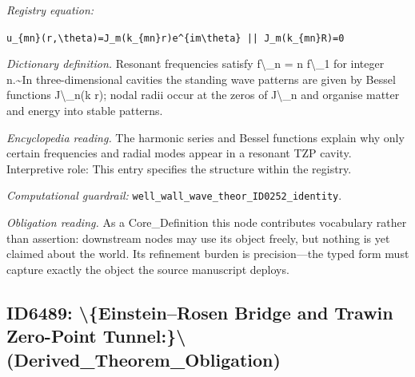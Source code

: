 \documentclass[11pt]{article}
\theoremstyle{remark}
\begin{document}
\noindent\textit{Registry equation:}\par
{\small\texttt{u\_\{mn\}(r,\textbackslash{}theta)=J\_m(k\_\{mn\}r)e\textasciicircum{}\{im\textbackslash{}theta\} || J\_m(k\_\{mn\}R)=0}}\par\medskip
\noindent\textit{Dictionary definition.} Resonant frequencies satisfy f\textbackslash{}\_n = n f\textbackslash{}\_1 for integer n.\textasciitilde{}In three-dimensional cavities the standing wave patterns are given by Bessel functions J\textbackslash{}\_n(k r); nodal radii occur at the zeros of J\textbackslash{}\_n and organise matter and energy into stable patterns.\par\medskip
\noindent\textit{Encyclopedia reading.} The harmonic series and Bessel functions explain why only certain frequencies and radial modes appear in a resonant TZP cavity. Interpretive role: This entry specifies the structure within the registry.
\par\medskip\noindent\textit{Computational guardrail:} \texttt{well\_wall\_wave\_theor\_ID0252\_identity}.
\par\medskip\noindent\textit{Obligation reading.} As a Core\_Definition this node contributes vocabulary rather than assertion: downstream nodes may use its object freely, but nothing is yet claimed about the world. Its refinement burden is precision---the typed form must capture exactly the object the source manuscript deploys.

\subsection{ID6489: \textbackslash{}\{Einstein--Rosen Bridge and Trawin Zero-Point Tunnel:\}\textbackslash{} (Derived\_Theorem\_Obligation)}
\end{document}
